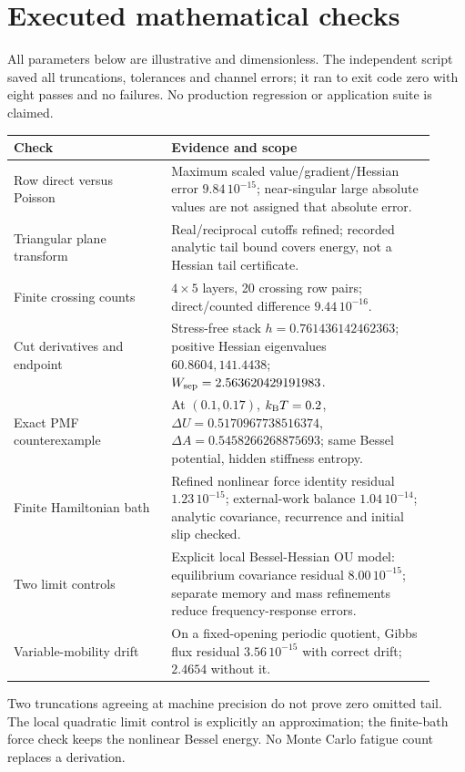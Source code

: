 \documentclass[11pt]{article}
\newcommand{\kb}{k_{\rm B}}
\begin{document}
\section{Executed mathematical checks}
All parameters below are illustrative and dimensionless. The independent
script saved all truncations, tolerances and channel errors; it ran to
exit code zero with eight passes and no failures. No production regression
or application suite is claimed.
\begin{center}\small
\begin{tabular}{p{0.34\linewidth}p{0.58\linewidth}}
\toprule
Check & Evidence and scope\\\midrule
Row direct versus Poisson & Maximum scaled value/gradient/Hessian error
$9.84\,10^{-15}$; near-singular large absolute values are not assigned that
absolute error.\\
Triangular plane transform & Real/reciprocal cutoffs refined; recorded
analytic tail bound covers energy, not a Hessian tail certificate.\\
Finite crossing counts & $4\times5$ layers, 20 crossing row pairs;
direct/counted difference $9.44\,10^{-16}$.\\
Cut derivatives and endpoint & Stress-free stack $h=0.761436142462363$;
positive Hessian eigenvalues $60.8604,141.4438$;
$W_{\rm sep}=2.563620429191983$.\\
Exact PMF counterexample & At $(0.1,0.17)$, $\kb T=0.2$,
$\Delta U=0.5170967738516374$, $\Delta A=0.5458266268875693$;
same Bessel potential, hidden stiffness entropy.\\
Finite Hamiltonian bath & Refined nonlinear force identity residual
$1.23\,10^{-15}$; external-work balance $1.04\,10^{-14}$;
analytic covariance, recurrence and initial slip checked.\\
Two limit controls & Explicit local Bessel-Hessian OU model: equilibrium
covariance residual $8.00\,10^{-15}$; separate memory and mass refinements
reduce frequency-response errors.\\
Variable-mobility drift & On a fixed-opening periodic quotient, Gibbs flux
residual $3.56\,10^{-15}$ with correct drift; $2.4654$ without it.\\
\bottomrule
\end{tabular}
\end{center}
Two truncations agreeing at machine precision do not prove zero omitted
tail. The local quadratic limit control is explicitly an approximation;
the finite-bath force check keeps the nonlinear Bessel energy. No Monte
Carlo fatigue count replaces a derivation.
\end{document}

